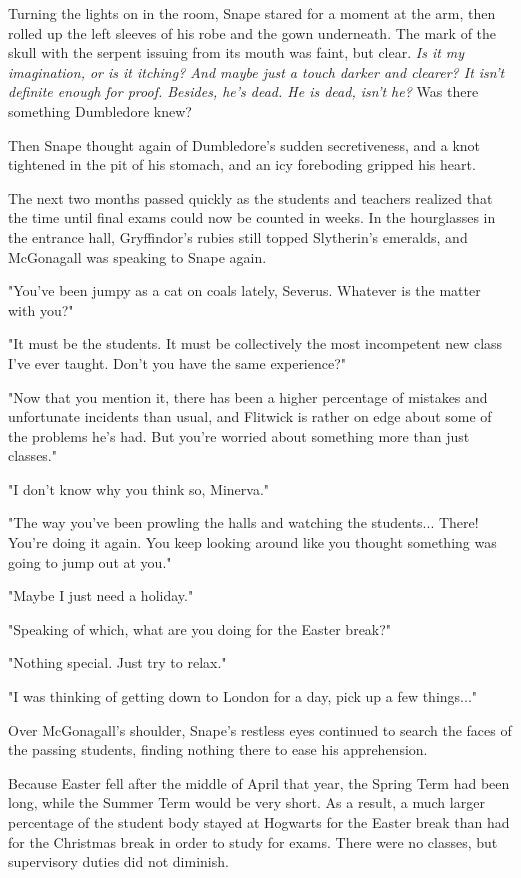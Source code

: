 Turning the lights on in the room, Snape stared for a moment at the arm, then rolled up the left sleeves of his robe and the gown underneath. The mark of the skull with the serpent issuing from its mouth was faint, but clear. \emph{Is it my imagination, or is it itching? And maybe just a touch darker and clearer? It isn't definite enough for proof. Besides, he's dead. He is dead, isn't he?} Was there something Dumbledore knew?

Then Snape thought again of Dumbledore's sudden secretiveness, and a knot tightened in the pit of his stomach, and an icy foreboding gripped his heart.

\sbreak

The next two months passed quickly as the students and teachers realized that the time until final exams could now be counted in weeks. In the hourglasses in the entrance hall, Gryffindor's rubies still topped Slytherin's emeralds, and McGonagall was speaking to Snape again.

"You've been jumpy as a cat on coals lately, Severus. Whatever is the matter with you?"

"It must be the students. It must be collectively the most incompetent new class I've ever taught. Don't you have the same experience?"

"Now that you mention it, there has been a higher percentage of mistakes and unfortunate incidents than usual, and Flitwick is rather on edge about some of the problems he's had. But you're worried about something more than just classes."

"I don't know why you think so, Minerva."

"The way you've been prowling the halls and watching the students... There! You're doing it again. You keep looking around like you thought something was going to jump out at you."

"Maybe I just need a holiday."

"Speaking of which, what are you doing for the Easter break?"

"Nothing special. Just try to relax."

"I was thinking of getting down to London for a day, pick up a few things..."

Over McGonagall's shoulder, Snape's restless eyes continued to search the faces of the passing students, finding nothing there to ease his apprehension.

\sbreak

Because Easter fell after the middle of April that year, the Spring Term had been long, while the Summer Term would be very short. As a result, a much larger percentage of the student body stayed at Hogwarts for the Easter break than had for the Christmas break in order to study for exams. There were no classes, but supervisory duties did not diminish.


